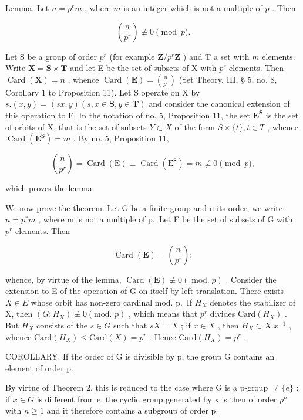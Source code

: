Lemma. Let \(n = p^r m\) , where \(m\) is an integer which is not a multiple of \(p\) . Then

\[
\binom {n} {p ^ {r}} \not \equiv 0 \pmod {p}.
\]

Let S be a group of order \(p^r\) (for example \(\mathbf{Z} / p^r\mathbf{Z}\) ) and T a set with \(m\) elements. Write \(\mathbf{X} = \mathbf{S} \times \mathbf{T}\) and let E be the set of subsets of X with \(p^r\) elements. Then \(\operatorname{Card}(\mathbf{X}) = n\) , whence \(\operatorname{Card}(\mathbf{E}) = \binom{n}{p^r}\) (Set Theory, III, § 5, no. 8, Corollary 1 to Proposition 11). Let S operate on X by \(s.(x,y) = (sx,y)(s,x \in \mathbf{S},y \in \mathbf{T})\) and consider the canonical extension of this operation to E. In the notation of no. 5, Proposition 11, the set \(\mathbf{E}^{\mathbf{S}}\) is the set of orbits of X, that is the set of subsets \(Y \subset X\) of the form \(S \times \{t\}, t \in T\) , whence \(\operatorname{Card}(\mathbf{E}^{\mathbf{S}}) = m\) . By no. 5, Proposition 11,

\[
\binom {n} {p ^ {r}} = \operatorname{Card} (\mathrm{E}) \equiv \operatorname{Card} (\mathrm{E} ^ {\mathrm{S}}) = m \not \equiv 0 \pmod {p},
\]

which proves the lemma.

We now prove the theorem. Let G be a finite group and n its order; we write \(n = p^{r}m\) , where m is not a multiple of p.~Let E be the set of subsets of G with \(p^{r}\) elements. Then

\[
\operatorname{Card} (\mathbf {E}) = \binom{n}{p ^ {r}};
\]

whence, by virtue of the lemma, \(\operatorname{Card}(\mathbf{E}) \not\equiv 0 (\operatorname{mod.} p)\) . Consider the extension to E of the operation of G on itself by left translation. There exists \(X \in E\) whose orbit has non-zero cardinal mod. p.~If \(H_{X}\) denotes the stabilizer of X, then \((G:H_{X}) \not\equiv 0 (\text{mod. } p)\) , which means that \(p^{r}\) divides \(\text{Card}(H_{X})\) . But \(H_{X}\) consists of the \(s \in G\) such that \(sX = X\) ; if \(x \in X\) , then \(H_{X} \subset X.x^{-1}\) , whence \(\text{Card}(H_{X}) \leqslant \text{Card}(X) = p^{r}\) . Hence \(\text{Card}(H_{X}) = p^{r}\) .

COROLLARY. If the order of G is divisible by p, the group G contains an element of order p.

By virtue of Theorem 2, this is reduced to the case where G is a p-group \(\neq\{e\}\) ; if \(x\in G\) is different from e, the cyclic group generated by x is then of order \(p^{n}\) with \(n\geqslant1\) and it therefore contains a subgroup of order p.

